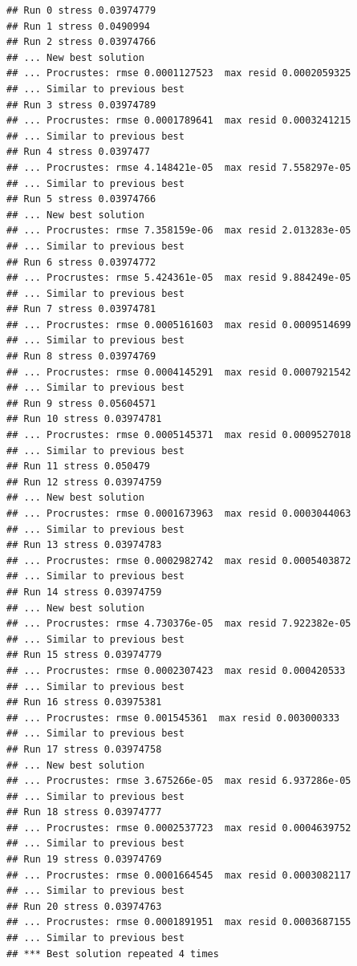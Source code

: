 \documentclass[
]{article}
\begin{document}
\begin{verbatim}
## Run 0 stress 0.03974779 
## Run 1 stress 0.0490994 
## Run 2 stress 0.03974766 
## ... New best solution
## ... Procrustes: rmse 0.0001127523  max resid 0.0002059325 
## ... Similar to previous best
## Run 3 stress 0.03974789 
## ... Procrustes: rmse 0.0001789641  max resid 0.0003241215 
## ... Similar to previous best
## Run 4 stress 0.0397477 
## ... Procrustes: rmse 4.148421e-05  max resid 7.558297e-05 
## ... Similar to previous best
## Run 5 stress 0.03974766 
## ... New best solution
## ... Procrustes: rmse 7.358159e-06  max resid 2.013283e-05 
## ... Similar to previous best
## Run 6 stress 0.03974772 
## ... Procrustes: rmse 5.424361e-05  max resid 9.884249e-05 
## ... Similar to previous best
## Run 7 stress 0.03974781 
## ... Procrustes: rmse 0.0005161603  max resid 0.0009514699 
## ... Similar to previous best
## Run 8 stress 0.03974769 
## ... Procrustes: rmse 0.0004145291  max resid 0.0007921542 
## ... Similar to previous best
## Run 9 stress 0.05604571 
## Run 10 stress 0.03974781 
## ... Procrustes: rmse 0.0005145371  max resid 0.0009527018 
## ... Similar to previous best
## Run 11 stress 0.050479 
## Run 12 stress 0.03974759 
## ... New best solution
## ... Procrustes: rmse 0.0001673963  max resid 0.0003044063 
## ... Similar to previous best
## Run 13 stress 0.03974783 
## ... Procrustes: rmse 0.0002982742  max resid 0.0005403872 
## ... Similar to previous best
## Run 14 stress 0.03974759 
## ... New best solution
## ... Procrustes: rmse 4.730376e-05  max resid 7.922382e-05 
## ... Similar to previous best
## Run 15 stress 0.03974779 
## ... Procrustes: rmse 0.0002307423  max resid 0.000420533 
## ... Similar to previous best
## Run 16 stress 0.03975381 
## ... Procrustes: rmse 0.001545361  max resid 0.003000333 
## ... Similar to previous best
## Run 17 stress 0.03974758 
## ... New best solution
## ... Procrustes: rmse 3.675266e-05  max resid 6.937286e-05 
## ... Similar to previous best
## Run 18 stress 0.03974777 
## ... Procrustes: rmse 0.0002537723  max resid 0.0004639752 
## ... Similar to previous best
## Run 19 stress 0.03974769 
## ... Procrustes: rmse 0.0001664545  max resid 0.0003082117 
## ... Similar to previous best
## Run 20 stress 0.03974763 
## ... Procrustes: rmse 0.0001891951  max resid 0.0003687155 
## ... Similar to previous best
## *** Best solution repeated 4 times
\end{verbatim}
\end{document}
